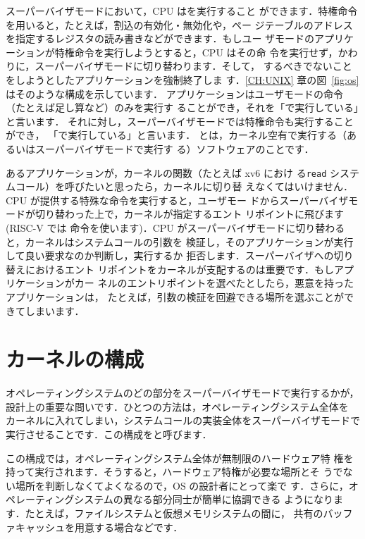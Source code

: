 スーパーバイザモードにおいて，CPU はを実行すること
ができます．特権命令を用いると，たとえば，割込の有効化・無効化や，ペー
ジテーブルのアドレスを指定するレジスタの読み書きなどができます．もしユー
ザモードのアプリケーションが特権命令を実行しようとすると，CPU はその命
令を実行せず，かわりに，スーパーバイザモードに切り替わります．そして，
するべきでないことをしようとしたアプリケーションを強制終了しま
す．\ref{CH:UNIX} 章の図~\ref{fig:os} はそのような構成を示しています．
アプリケーションはユーザモードの命令（たとえば足し算など）のみを実行す
ることができ，それを「で実行している」と言います．
それに対し，スーパーバイザモードでは特権命令も実行することができ，
「で実行している」と言います．
とは，カーネル空有で実行する（あるいはスーパーバイザモードで実行す
る）ソフトウェアのことです．

あるアプリケーションが，カーネルの関数（たとえば xv6 におけ
る\lstinline{read} システムコール）を呼びたいと思ったら，カーネルに切り替
えなくてはいけません．CPU が提供する特殊な命令を実行すると，ユーザモー
ドからスーパーバイザモードが切り替わった上で，カーネルが指定するエント
リポイントに飛びます (RISC-V では  命令を使います)．CPU
がスーパーバイザモードに切り替わると，カーネルはシステムコールの引数を
検証し，そのアプリケーションが実行して良い要求なのか判断し，実行するか
拒否します．スーパーバイザへの切り替えにおけるエント
リポイントをカーネルが支配するのは重要です．もしアプリケーションがカー
ネルのエントリポイントを選べたとしたら，悪意を持ったアプリケーションは，
たとえば，引数の検証を回避できる場所を選ぶことができてしまいます．


\section{カーネルの構成}

オペレーティングシステムのどの部分をスーパーバイザモードで実行するかが，
設計上の重要な問いです．ひとつの方法は，オペレーティングシステム全体を
カーネルに入れてしまい，システムコールの実装全体をスーパーバイザモードで
実行させることです．この構成をと呼びます．

この構成では，オペレーティングシステム全体が無制限のハードウェア特
権を持って実行されます．そうすると，ハードウェア特権が必要な場所とそ
うでない場所を判断しなくてよくなるので，OS の設計者にとって楽で
す．さらに，オペレーティングシステムの異なる部分同士が簡単に協調できる
ようになります．たとえば，ファイルシステムと仮想メモリシステムの間に，
共有のバッファキャッシュを用意する場合などです．

